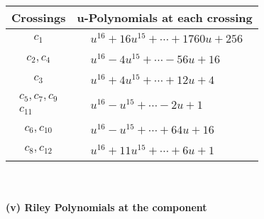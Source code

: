 \documentclass[1p]{elsarticle_modified}
\theoremstyle{definition}
\begin{document}
\begin{tabular}{m{50pt}|m{274pt}}
Crossings & \hspace{64pt}u-Polynomials at each crossing \\
\hline $$\begin{aligned}c_{1}\end{aligned}$$&$\begin{aligned}
&u^{16}+16 u^{15}+\cdots+1760 u+256
\end{aligned}$\\
\hline $$\begin{aligned}c_{2},c_{4}\end{aligned}$$&$\begin{aligned}
&u^{16}-4 u^{15}+\cdots-56 u+16
\end{aligned}$\\
\hline $$\begin{aligned}c_{3}\end{aligned}$$&$\begin{aligned}
&u^{16}+4 u^{15}+\cdots+12 u+4
\end{aligned}$\\
\hline $$\begin{aligned}c_{5},c_{7},c_{9}\\c_{11}\end{aligned}$$&$\begin{aligned}
&u^{16}- u^{15}+\cdots-2 u+1
\end{aligned}$\\
\hline $$\begin{aligned}c_{6},c_{10}\end{aligned}$$&$\begin{aligned}
&u^{16}- u^{15}+\cdots+64 u+16
\end{aligned}$\\
\hline $$\begin{aligned}c_{8},c_{12}\end{aligned}$$&$\begin{aligned}
&u^{16}+11 u^{15}+\cdots+6 u+1
\end{aligned}$\\
\hline
\end{tabular}\\~\\
\newpage\renewcommand{\arraystretch}{1}
\flushleft \textbf{(v) Riley Polynomials at the component}\newline \\
\end{document}
